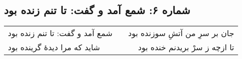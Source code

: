 \begin{center}
\section*{شماره ۶: شمع آمد و گفت: تا تنم زنده بود}
\label{sec:006}
\begin{longtable}{l p{0.5cm} r}
شمع آمد و گفت: تا تنم زنده بود
&&
جان بر سرِ من آتشِ سوزنده بود
\\
شاید که مرا دیدهٔ گرینده بود
&&
تا ازچه ز سرْ بریدنم خنده بود
\\
\end{longtable}
\end{center}
